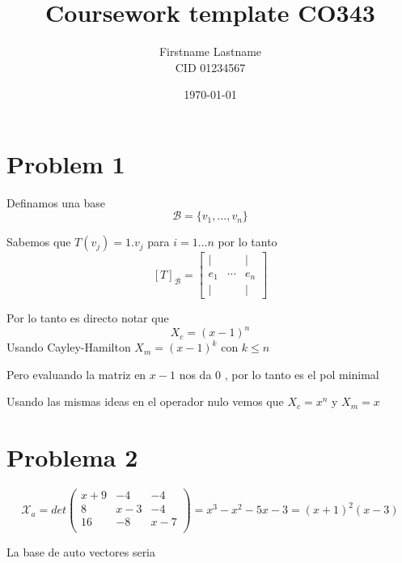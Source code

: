 \documentclass{article}
\title{Coursework template CO343}
\author{Firstname Lastname \\ CID 01234567}
\date{\today}
\begin{document}
\maketitle

\section{Problem 1}
    Definamos una base \[\mathcal{B}= \{v_1,\ldots,v_n\} \]

    Sabemos que $T(v_j) = 1.v_j$ para $i=1\ldots n$ por lo tanto
    \[[T]_{ \mathcal{B} } = 
    \begin{bmatrix}
        \vert & & \vert \\
        e_1   & \cdots & e_n   \\
        \vert & & \vert
    \end{bmatrix}
    \]

    Por lo tanto es directo notar que \[X_c = (x-1)^n\]
    Usando Cayley-Hamilton $X_m = (x-1)^k$ con $k\leq n$

    Pero evaluando la matriz en $x-1$ nos da 0 , por lo tanto es el 
    pol minimal

    Usando las mismas ideas en el operador nulo vemos que
     $X_c = x^n$ y $X_m=x$

\section{Problema 2}
    \[ \mathcal{X}_a= det
    \begin{pmatrix}
    x+9 & -4 & -4\\
    8 & x-3 & -4 \\
    16 & -8 & x-7 \\
    \end{pmatrix} 
    = x^3 - x^2 -5x -3 = (x+1)^2 (x-3)\]

    La base de auto vectores seria \[\]
\end{document}
